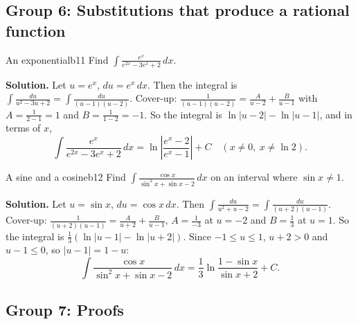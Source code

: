 \documentclass[11pt]{article}
\begin{document}
\subsection*{Group 6: Substitutions that produce a rational function}

\begin{exmp}{An exponential}{b11}
Find $\displaystyle\int\frac{e^x}{e^{2x}-3e^x+2}\,dx$.

\textbf{Solution.} Let $u=e^x$, $du=e^x\,dx$. Then the integral is $\int\frac{du}{u^2-3u+2}=\int\frac{du}{(u-1)(u-2)}$. Cover-up: $\frac1{(u-1)(u-2)}=\frac A{u-2}+\frac B{u-1}$ with $A=\frac1{2-1}=1$ and $B=\frac1{1-2}=-1$. So the integral is $\ln\lvert u-2\rvert-\ln\lvert u-1\rvert$, and in terms of $x$,
\[\int\frac{e^x}{e^{2x}-3e^x+2}\,dx=\ln\left\lvert\frac{e^x-2}{e^x-1}\right\rvert+C\quad(x\ne0,\ x\ne\ln2).\]
\end{exmp}

\begin{exmp}{A sine and a cosine}{b12}
Find $\displaystyle\int\frac{\cos x}{\sin^2x+\sin x-2}\,dx$ on an interval where $\sin x\ne1$.

\textbf{Solution.} Let $u=\sin x$, $du=\cos x\,dx$. Then $\int\frac{du}{u^2+u-2}=\int\frac{du}{(u+2)(u-1)}$. Cover-up: $\frac1{(u+2)(u-1)}=\frac A{u+2}+\frac B{u-1}$, $A=\frac1{-3}$ at $u=-2$ and $B=\frac13$ at $u=1$. So the integral is $\frac13\left(\ln\lvert u-1\rvert-\ln\lvert u+2\rvert\right)$. Since $-1\le u\le1$, $u+2>0$ and $u-1\le0$, so $\lvert u-1\rvert=1-u$:
\[\int\frac{\cos x}{\sin^2x+\sin x-2}\,dx=\frac13\ln\frac{1-\sin x}{\sin x+2}+C .\]
\end{exmp}

\subsection*{Group 7: Proofs}
\end{document}
